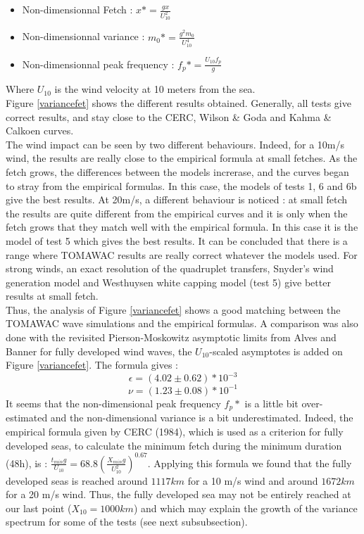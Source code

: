 \begin{itemize}
\item Non-dimensionnal Fetch : $x* = \frac{g x}{U_{10}^2}$
\item Non-dimensionnal variance : $m_{0}* = \frac{g^2 m_{0}}{U_{10}^4}$
\item Non-dimensionnal peak frequency : $f_{p}* = \frac{U_{10} f_{p}}{g}$
\end{itemize}
Where $U_{10}$ is the wind velocity at 10 meters from the sea.\\

Figure \ref{variancefet} shows the different results obtained. Generally, all tests give correct results, and stay close to the CERC, Wilson \& Goda and Kahma \& Calkoen curves.\\
The wind impact can be seen by two different behaviours. Indeed, for a 10m/s wind, the results are really close to the empirical formula at small fetches. As the fetch grows, the differences between the models increrase, and the curves began to stray from the empirical formulas. In this case, the models of tests 1, 6 and 6b give the best results. At 20m/s, a different behaviour is noticed : at small fetch the results are quite different from the empirical curves and it is only when the fetch grows that they match well with the empirical formula. In this case it is the model of test 5 which gives the best results. It can be concluded that there is a range where TOMAWAC results are really correct whatever the models used. For strong winds, an exact resolution of the quadruplet transfers, Snyder's wind generation model and Westhuysen white capping model (test 5) give better results at small fetch. \\
Thus, the analysis of Figure \ref{variancefet} shows a good matching between the  TOMAWAC wave simulations and the empirical formulas. A comparison was also done with the revisited Pierson-Moskowitz asymptotic limits from Alves and Banner \cite{alves} for fully developed wind waves, the $U_{10}$-scaled asymptotes is added on Figure \ref{variancefet}. The formula gives :
\[\epsilon = (4.02 \pm 0.62)*10^{-3}\]
\[\nu = (1.23 \pm 0.08)* 10^{-1}\]
 It seems that the non-dimensional peak frequency $f_p*$ is a little bit over-estimated and the non-dimensional variance is a bit underestimated. Indeed, the empirical formula given by CERC (1984), which is used as a criterion for fully developed seas, to calculate the minimum fetch during the minimum duration (48h), is : $\frac{t_{min} g}{U_{10}} = 68.8 (\frac{X_{min} g}{U_{10}^2})^{0.67}$. Applying this formula we found that the fully developed seas is reached around $1 117 km$ for a 10 m/s wind and around $1 672 km$ for a 20 m/s wind. Thus, the fully developed sea may not be entirely reached at our last point ($X_{10} = 1000km$) and which may explain the growth of the variance spectrum for some of the tests (see next subsubsection).

